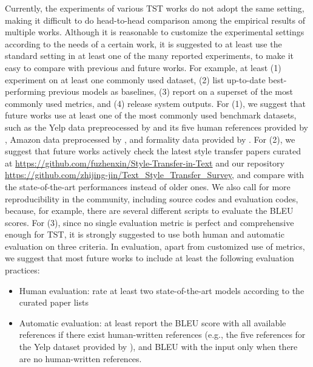 Currently, the experiments of various TST works do not adopt the same setting, making it difficult to do head-to-head comparison among the empirical results of multiple works. Although it is reasonable to customize the experimental settings according to the needs of a certain work, it is suggested to at least use the standard setting in at least one of the many reported experiments, to make it easy to compare with previous and future works. For example, at least (1) experiment on at least one commonly used dataset, (2) list up-to-date best-performing previous models as baselines, (3) report on a superset of the most commonly used metrics, and (4) release system outputs.
For (1), we suggest that future works use at least one of the most commonly used benchmark datasets, such as the Yelp data prepreocessed by  and its five human references provided by , Amazon data preprocessed by , and formality data provided by .
For (2), we suggest that future works actively check the latest style transfer papers curated at \url{https://github.com/fuzhenxin/Style-Transfer-in-Text} and our repository \url{https://github.com/zhijing-jin/Text_Style_Transfer_Survey}, and compare with the state-of-the-art performances instead of older ones. We also call for more reproducibility in the community, including source codes and evaluation codes, because, for example, there are several different scripts to evaluate the BLEU scores.
For (3), since no single evaluation metric is perfect and comprehensive enough for TST, it is strongly suggested to use both human and automatic evaluation on three criteria. In evaluation, apart from customized use of metrics, we suggest that most future works to include at least the following evaluation practices:
\begin{itemize}[nolistsep]
    \item Human evaluation: rate at least two state-of-the-art models according to the curated paper lists
    \item Automatic evaluation: at least report the BLEU score with all available references if there exist human-written references (e.g., the five references for the Yelp dataset provided by ), and BLEU with the input only when there are no human-written references.
\end{itemize}

